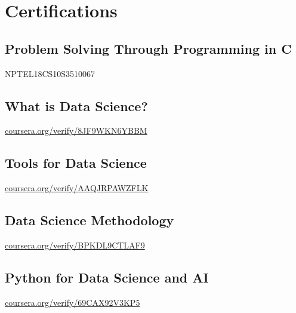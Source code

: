 \documentclass[]{deedy-resume-openfont}
\begin{document}
\begin{minipage}[t]{0.66\textwidth}
\section{Certifications} 
\sectionsep
\subsection{Problem Solving Through Programming in C}
NPTEL18CS10S3510067\\
\sectionsep

\sectionsep
\subsection{What is Data Science?}
\href{https://www.coursera.org/verify/8JF9WKN6YBBM}{coursera.org/verify/8JF9WKN6YBBM}\\
\sectionsep

\sectionsep
\subsection{Tools for Data Science}
\href{https://www.coursera.org/verify/AAQJRPAWZFLK}{coursera.org/verify/AAQJRPAWZFLK}\\
\sectionsep


\sectionsep
\subsection{Data Science Methodology}
\href{https://www.coursera.org/verify/BPKDL9CTLAF9}{coursera.org/verify/BPKDL9CTLAF9}\\
\sectionsep

\sectionsep
\subsection{Python for Data Science and AI}
\href{https://www.coursera.org/verify/69CAX92V3KP5}{coursera.org/verify/69CAX92V3KP5}\\
\sectionsep

\end{minipage} 
\end{document}
